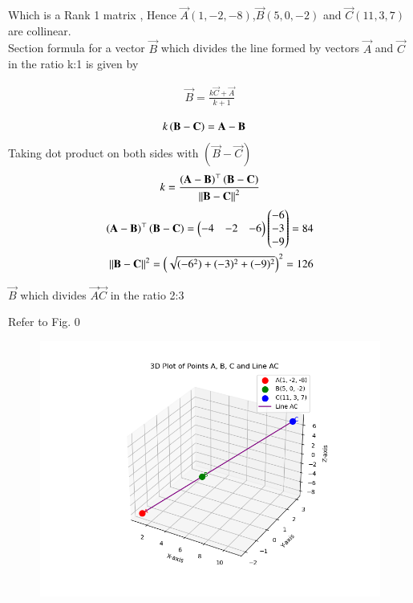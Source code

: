 \documentclass[journal]{IEEEtran}
\begin{document}
Which is a Rank 1 matrix , Hence   $\vec{A}(1,-2,-8)$,$\vec{B}(5,0,-2)$ and $\vec{C}(11,3,7)$ are collinear.\\

Section formula for a vector $\vec{B}$ which divides the line formed by vectors $\vec{A}$ and $\vec{C}$ in the ratio k:1 is given by

\begin{align}
    \vec{B}=\frac{k\vec{C}+\vec{A}}{k+1}\\
\end{align}
\begin{align}
			k\left(\mathbf{B}-\mathbf{C}\right)&= \mathbf{A}-\mathbf{B}
            \end{align}
Taking dot product on both sides with $(\vec{B}-\vec{C})$
\begin{align}
 k =\frac{\left(\mathbf{A}-\mathbf{B}\right)^{\top}\left(\mathbf{B}-\mathbf{C}\right)}{\left\lVert\mathbf{B}-\mathbf{C}\right\rVert^2}
\end{align}
\bigskip
\begin{align}
\left(\mathbf{A}-\mathbf{B}\right)^{\top}\left(\mathbf{B}-\mathbf{C}\right) = \begin{pmatrix}-4 & -2 &  -6 \end{pmatrix}\begin{pmatrix}-6\\-3\\-9\end{pmatrix} = 84\\
{\left\lVert\mathbf{B}-\mathbf{C}\right\rVert^2} = \left(\sqrt{(-6^2) + (-3)^2 + (-9)^2}\right)^2 = 126
\end{align}


 $\vec{B}$ which divides  $\vec{A}\vec{C}$ in the ratio 2:3


Refer to Fig. 0

\begin{figure}[H]
\begin{center}
\includegraphics[width=0.6\columnwidth]{figs/Fig.png}
\end{center}
\caption{}
\label{fig:Fig}
\end{figure}
\end{document}
